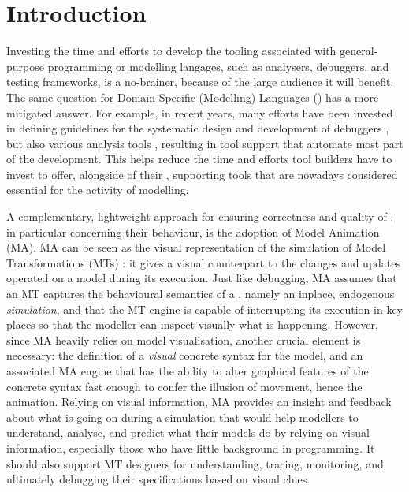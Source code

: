 \section{Introduction}
\label{sec:Introduction}

Investing the time and efforts to develop the tooling associated with general-purpose
programming or modelling langages, such as analysers, debuggers, and testing
frameworks, is a no-brainer, because of the large audience it will benefit.
The same question for Domain-Specific (Modelling) Languages (\DSMLs) has a
more mitigated answer. For example, in recent years, many efforts have been
invested in defining guidelines for the systematic design and development of 
\DSL debuggers 
\cite{bousse2018omniscient,J:VanMierlo-Vangheluwe-etAl:2020,J:Corley-Eddy-Syriani-Grey:2016},
but also various analysis tools \cite{Meyers-Deshayes-etAl:2014}, resulting in
tool support that automate most part of the development. This helps reduce the
time and efforts \DSL tool builders have to invest to offer, alongside of their
\DSL, supporting tools that are nowadays considered essential for the activity
of \DSL modelling.

A complementary, lightweight approach for ensuring correctness and quality of
\DSLs, in particular concerning their behaviour, is the adoption of Model 
Animation (MA). MA can be seen as the visual representation of the simulation of
Model Transformations (MTs) \cite{J:Lucio-Amrani-etAl:2014}: it gives a visual 
counterpart to the changes and updates operated on a model during its execution.
Just like debugging, MA assumes that an MT captures the behavioural semantics 
of a \DSL, namely an inplace, endogenous \emph{simulation}, and that the MT 
engine is capable of interrupting its execution in key places so that the 
modeller can inspect visually what is happening. However,
since MA heavily relies on model visualisation, another crucial element is necessary:
the definition of a \emph{visual} concrete syntax for the model, and an associated
MA engine that has the ability to alter graphical features of the concrete syntax
fast enough to confer the illusion of movement, hence the animation. Relying
on visual information, MA provides an insight and feedback about what is going on
during a simulation that would help modellers to understand, analyse, and predict
what their models do by relying on visual information, especially those who have
little background in programming. It should also support MT designers for understanding,
tracing, monitoring, and ultimately debugging their specifications based on visual
clues.

